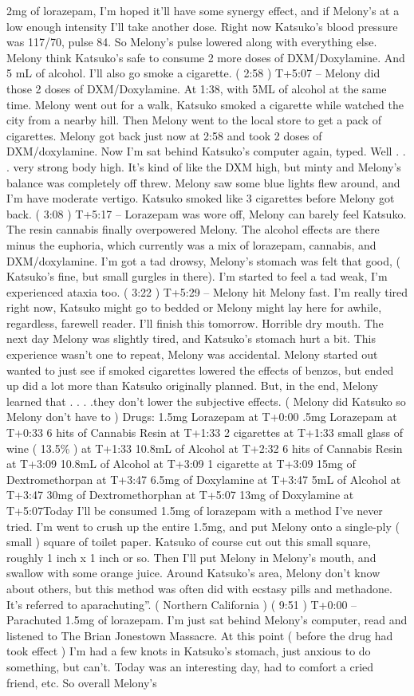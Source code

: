 \documentclass[12pt]{book}
\begin{document}
2mg of lorazepam, I'm hoped it'll have some synergy effect, and if Melony's at a low enough intensity I'll take another dose. Right now Katsuko's blood pressure was 117/70, pulse 84. So Melony's pulse lowered along with everything else. Melony think Katsuko's safe to consume 2 more doses of DXM/Doxylamine. And 5 mL of alcohol. I'll also go smoke a cigarette. ( 2:58 ) T+5:07 -- Melony did those 2 doses of DXM/Doxylamine. At 1:38, with 5ML of alcohol at the same time. Melony went out for a walk, Katsuko smoked a cigarette while watched the city from a nearby hill. Then Melony went to the local store to get a pack of cigarettes. Melony got back just now at 2:58 and took 2 doses of DXM/doxylamine. Now I'm sat behind Katsuko's computer again, typed. Well . . .  very strong body high. It's kind of like the DXM high, but minty and Melony's balance was completely off threw. Melony saw some blue lights flew around, and I'm have moderate vertigo. Katsuko smoked like 3 cigarettes before Melony got back. ( 3:08 ) T+5:17 -- Lorazepam was wore off, Melony can barely feel Katsuko. The resin cannabis finally overpowered Melony. The alcohol effects are there minus the euphoria, which currently was a mix of lorazepam, cannabis, and DXM/doxylamine. I'm got a tad drowsy, Melony's stomach was felt that good, ( Katsuko's fine, but small gurgles in there). I'm started to feel a tad weak, I'm experienced ataxia too. ( 3:22 ) T+5:29 -- Melony hit Melony fast. I'm really tired right now, Katsuko might go to bedded or Melony might lay here for awhile, regardless, farewell reader. I'll finish this tomorrow. Horrible dry mouth. The next day Melony was slightly tired, and Katsuko's stomach hurt a bit. This experience wasn't one to repeat, Melony was accidental. Melony started out wanted to just see if smoked cigarettes lowered the effects of benzos, but ended up did a lot more than Katsuko originally planned. But, in the end, Melony learned that . . .  .they don't lower the subjective effects. ( Melony did Katsuko so Melony don't have to ) Drugs: 1.5mg Lorazepam at T+0:00 .5mg Lorazepam at T+0:33 6 hits of Cannabis Resin at T+1:33 2 cigarettes at T+1:33 small glass of wine ( 13.5\% ) at T+1:33 10.8mL of Alcohol at T+2:32 6 hits of Cannabis Resin at T+3:09 10.8mL of Alcohol at T+3:09 1 cigarette at T+3:09 15mg of Dextromethorpan at T+3:47 6.5mg of Doxylamine at T+3:47 5mL of Alcohol at T+3:47 30mg of Dextromethorphan at T+5:07 13mg of Doxylamine at T+5:07Today I'll be consumed 1.5mg of lorazepam with a method I've never tried. I'm went to crush up the entire 1.5mg, and put Melony onto a single-ply ( small ) square of toilet paper. Katsuko of course cut out this small square, roughly 1 inch x 1 inch or so. Then I'll put Melony in Melony's mouth, and swallow with some orange juice. Around Katsuko's area, Melony don't know about others, but this method was often did with ecstasy pills and methadone. It's referred to aparachuting''. ( Northern California ) ( 9:51 ) T+0:00 -- Parachuted 1.5mg of lorazepam. I'm just sat behind Melony's computer, read and listened to The Brian Jonestown Massacre. At this point ( before the drug had took effect ) I'm had a few knots in Katsuko's stomach, just anxious to do something, but can't. Today was an interesting day, had to comfort a cried friend, etc. So overall Melony's 
\end{document}
